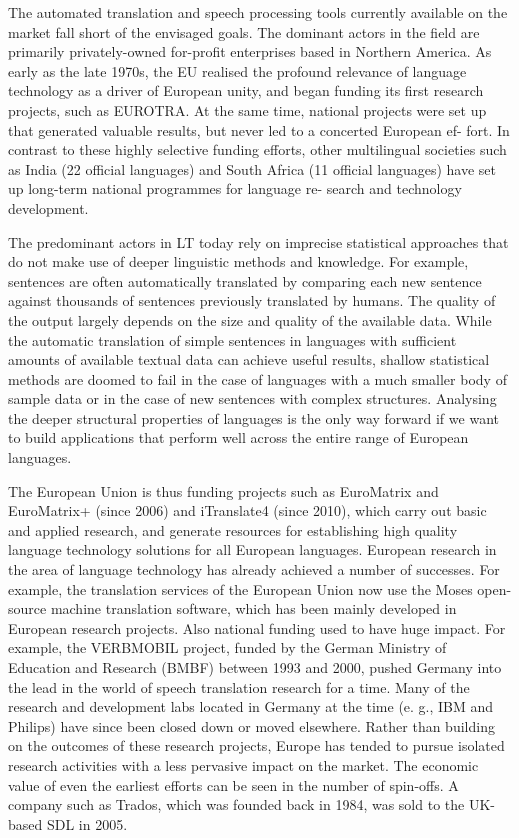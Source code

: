 \begin{multicols}{2}
The automated translation and speech processing tools currently available on the market fall short of the envisaged goals. The dominant actors in the field are primarily privately-owned for-profit enterprises based in Northern America. As early as the late 1970s, the EU realised the profound relevance of language technology as a driver of European unity, and began funding its first research projects, such as EUROTRA. At the same time, national projects were set up that generated valuable results, but never led to a concerted European ef- fort. In contrast to these highly selective funding efforts, other multilingual societies such as India (22 official languages) and South Africa (11 official languages) have set up long-term national programmes for language re- search and technology development.

The predominant actors in LT today rely on imprecise statistical approaches that do not make use of deeper linguistic methods and knowledge. For example, sentences are often automatically translated by comparing each new sentence against thousands of sentences previously translated by humans. The quality of the output largely depends on the size and quality of the available data. While the automatic translation of simple sentences in languages with sufficient amounts of available textual data can achieve useful results, shallow statistical methods are doomed to fail in the case of languages with a much smaller body of sample data or in the case of new sentences with complex structures. Analysing the deeper structural properties of languages is the only way forward if we want to build applications that perform well across the entire range of European languages.

The European Union is thus funding projects such as EuroMatrix and EuroMatrix+ (since 2006) and iTranslate4 (since 2010), which carry out basic and applied research, and generate resources for establishing high quality language technology solutions for all European languages. European research in the area of language technology has already achieved a number of successes. For example, the translation services of the European Union now use the Moses open-source machine translation software, which has been mainly developed in European research projects. Also national funding used to have huge impact. For example, the VERBMOBIL project, funded by the German Ministry of Education and Research (BMBF) between 1993 and 2000, pushed Germany into the lead in the world of speech translation research for a time. Many of the research and development labs located in Germany at the time (e. g., IBM and Philips) have since been closed down or moved elsewhere. Rather than building on the outcomes of these research projects, Europe has tended to pursue isolated research activities with a less pervasive impact on the market. The economic value of even the earliest efforts can be seen in the number of spin-offs. A company such as Trados, which was founded back in 1984, was sold to the UK-based SDL in 2005.


\end{multicols}
